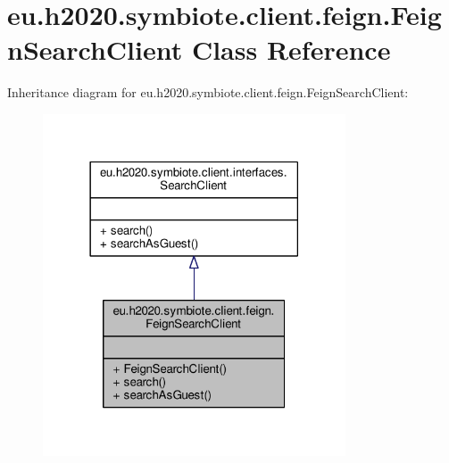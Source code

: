 \hypertarget{classeu_1_1h2020_1_1symbiote_1_1client_1_1feign_1_1FeignSearchClient}{}\section{eu.\+h2020.\+symbiote.\+client.\+feign.\+Feign\+Search\+Client Class Reference}
\label{classeu_1_1h2020_1_1symbiote_1_1client_1_1feign_1_1FeignSearchClient}


Inheritance diagram for eu.\+h2020.\+symbiote.\+client.\+feign.\+Feign\+Search\+Client\+:\nopagebreak
\begin{figure}[H]
\begin{center}
\leavevmode
\includegraphics[width=254pt]{classeu_1_1h2020_1_1symbiote_1_1client_1_1feign_1_1FeignSearchClient__inherit__graph}
\end{center}
\end{figure}


